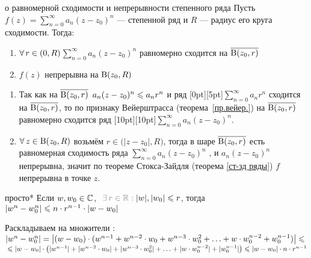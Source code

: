 \begin{teor}[https://youtu.be/zgKkH3Nr6-4?si=Reb0bWLxxqPReBy9&t=3976]{о равномерной сходимости и непрерывности степенного ряда}
		Пусть $f(z) = \sum\limits_{n = 0}^{\infty} a_n(z - z_0)^n$ --- степенной ряд и $R$ --- радиус его круга сходимости. Тогда:
		\begin{enumerate}
			\item $\forall \, r \in (0, R)$\quad $\sum\limits_{n = 0}^{\infty} a_n(z - z_0)^n$ равномерно сходится на $\overline{\mathrm B(z_0, r)}$
			
			\item $f(z)$ непрерывна на $\mathrm B(z_0, R)$
		\end{enumerate}
\end{teor}

\begin{prf}\begin{enumerate}
	\item Так как на $\overline{\mathrm B(z_0, r)}$ $ a_n(z - z_0)^n \leqslant a_n r^n$ и ряд \raisebox{0pt}[0pt][5pt]{$\sum\limits_{n = 0}^{\infty} a_n r^n$} сходится на $\overline{\mathrm B(z_0, r)}$, то по признаку Вейерштрасса (теорема~\ref{пр.вейер.}) на $\overline{\mathrm B(z_0, r)}$ равномерно сходится ряд \raisebox{0pt}[10pt][10pt]{$\sum\limits_{n = 0}^{\infty} a_n(z - z_0)^n$}.
	
	\item $\forall \, z \in \mathrm B(z_0, R)$ возьмём $r \in \bigl(|z - z_0|, R\bigr)$, тогда в шаре $\overline{\mathrm B(z_0, r)}$ есть равномерная сходимость ряда $\sum\limits_{n = 0}^{\infty} a_n(z - z_0)^n$ , и $a_n(z - z_0)^n$ непрерывна, значит по теореме Стокса-Зайдля (теорема \ref{ст-зд ряды}) $f$ непрерывна в точке $z$.
\end{enumerate}\end{prf}

\begin{lem}[https://www.youtube.com/live/AWZbCBfOlt4?si=T48B5aabxehlgrPt&t=11387]{просто}*\label{просто}
	Если $w, w_0 \in \mathbb{C}$,$\uns{\E r \in \rr :{}} |w|, |w_0| \< r$, тогда  $|w^n - w_0^n| \leqslant n \cdot r^{n - 1} \cdot |w - w_0|$
\end{lem}

\begin{prf}
	Раскладываем на множители :\\
	$|w^n - w_0^n| = \bigl|(w - w_0) \cdot (w^{n - 1} + w^{n - 2} \cdot w_0 + w^{n - 3} \cdot w_0^2 + \ldots + w \cdot w_0^{n - 2} + w_0^{n - 1})\bigr| \leqslant{}$ \\
	${}\leqslant|w - w_0| \cdot \bigl(|w^{n - 1}| + |w^{n - 2} \cdot w_0| + |w^{n - 3} \cdot w_0^2| + \ldots + |w \cdot w_0^{n - 2}| +|w_0^{n - 1}|\bigr) \leqslant |w - w_0| \cdot n \cdot r^{n - 1}$
\end{prf}

